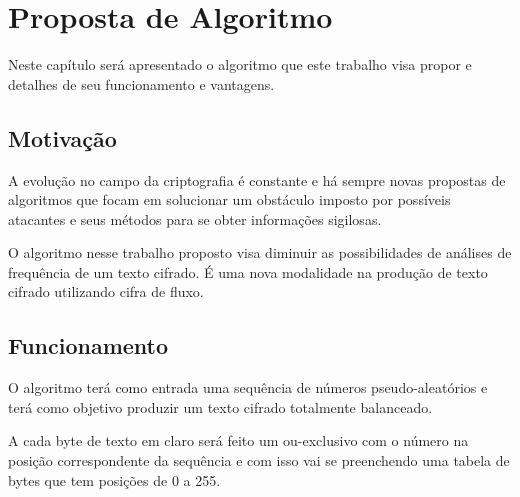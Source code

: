 \chapter{Proposta de Algoritmo}
\label{algorithm-proposition}

Neste capítulo será apresentado o algoritmo que este trabalho visa propor e detalhes de seu funcionamento e vantagens.

\section{Motivação}
\label{motivation}

A evolução no campo da criptografia é constante e há sempre novas propostas de algoritmos que focam em solucionar um obstáculo imposto por possíveis atacantes e seus métodos para se obter informações sigilosas.

O algoritmo nesse trabalho proposto visa diminuir as possibilidades de análises de frequência de um texto cifrado. É uma nova modalidade na produção de texto cifrado utilizando cifra de fluxo. 


\section{Funcionamento}
\label{functioning}

O algoritmo terá como entrada uma sequência de números pseudo-aleatórios e terá como objetivo produzir um texto cifrado totalmente balanceado.

A cada byte de texto em claro será feito um ou-exclusivo com o número na posição correspondente da sequência e com isso vai se preenchendo uma tabela de bytes que tem posições de 0 a 255.

